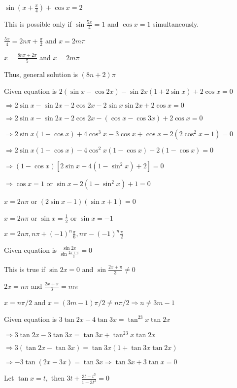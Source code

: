   $\sin\left(x +\frac{x}{4}\right) + \cos x = 2$

  This is possible only if $\sin\frac{5x}{4} = 1$ and $\cos x = 1$ simultaneously.

  $\frac{5x}{4} = 2n\pi + \frac{\pi}{2}$ and $x = 2m\pi$

  $x = \frac{8n\pi + 2\pi}{5}$ and $x = 2m\pi$

  Thus, general solution is $(8n + 2)\pi$

\item Given equation is $2(\sin x -\cos2x) - \sin2x(1 + 2\sin x) + 2\cos x = 0$

  $\Rightarrow 2\sin x -\sin2x - 2\cos2x -2\sin x\sin2x + 2\cos x = 0$

  $\Rightarrow 2\sin x -\sin2x - 2\cos2x - (\cos x - \cos3x) + 2\cos x = 0$

  $\Rightarrow 2\sin x(1 - \cos x) + 4\cos^3x - 3\cos x + \cos x - 2(2\cos^2x - 1) = 0$

  $\Rightarrow 2\sin x(1 - \cos x) -4\cos^2x(1 - \cos x) + 2(1 - \cos x) = 0$

  $\Rightarrow (1 - \cos x)[2\sin x - 4(1 - \sin^2x) + 2] =0$

  $\Rightarrow \cos x = 1$ or $\sin x - 2(1 -\sin^2x) + 1 = 0$

  $x = 2n\pi$ or $(2\sin x - 1)(\sin x+ 1) = 0$

  $x = 2n\pi$ or $\sin x = \frac{1}{2}$ or $\sin x = -1$

  $x = 2n\pi, n\pi + (-1)^n\frac{\pi}{6}, n\pi - (-1)^n\frac{\pi}{2}$

\item Given equation is $\frac{\sin2x}{\sin\frac{2x + \pi}{3}} = 0$

  This is true if $\sin2x = 0$ and $\sin\frac{2x + \pi}{3}\neq 0$

  $2x = n\pi$ and $\frac{2x + \pi}{3} = m\pi$

  $x = n\pi/2$ and $x = (3m - 1)\pi/2 \neq n\pi/2 \Rightarrow n \neq 3m - 1$

\item Given equation is $3\tan2x - 4\tan3x = \tan^23x\tan2x$

  $\Rightarrow 3\tan2x - 3\tan3x = \tan3x + \tan^23x\tan2x$

  $\Rightarrow 3(\tan2x - \tan3x) = \tan3x(1 + \tan3x\tan2x)$

  $\Rightarrow -3\tan(2x - 3x) = \tan 3x \Rightarrow \tan3x + 3\tan x = 0$

  Let $\tan x = t,$ then $3t + \frac{3t - t^3}{1 - 3t^2} = 0$

